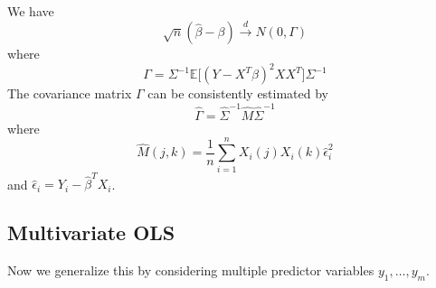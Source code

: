   \begin{theorem}
    \label{thm:central-limit-theorem-of-ols}
    We have 
    \begin{equation}
      \sqrt{n} (\hat{\beta} - \beta) \xrightarrow{d} N(0, \Gamma) 
    \end{equation}
    where 
    \begin{equation}
      \Gamma = \Sigma^{-1} \mathbb{E} \big[ (Y - X^T \beta)^2 X X^T \big] \Sigma^{-1}
    \end{equation}
    The covariance matrix $\Gamma$ can be consistently estimated by 
    \begin{equation}
      \hat{\Gamma} = \hat{\Sigma}^{-1} \hat{M} \hat{\Sigma}^{-1}
    \end{equation}
    where 
    \begin{equation}
      \hat{M} (j, k) = \frac{1}{n} \sum_{i=1}^n X_i (j) X_i (k) \hat{\epsilon}_i^2
    \end{equation}
    and $\hat{\epsilon}_i = Y_i - \hat{\beta}^T X_i$.
  \end{theorem}

\subsection{Multivariate OLS} 

  Now we generalize this by considering multiple predictor variables $y_1, \ldots, y_m$. 


